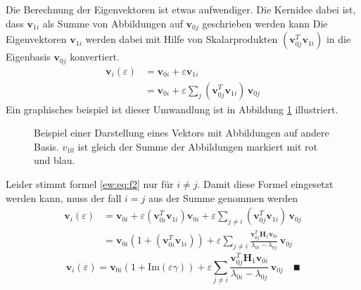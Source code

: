 Die Berechnung der Eigenvektoren ist etwas aufwendiger.
Die Kernidee dabei ist, dass $\bm v_{1i}$ als Summe von Abbildungen auf $\bm v_{0j}$ geschrieben werden kann
Die Eigenvektoren $\bm v_{1i}$ werden dabei mit Hilfe von Skalarprodukten $( \bm v_{0j}^T \bm v_{1i})$ in die Eigenbasis $\bm v_{0j}$ konvertiert. %
\begin{align*}
    \bm v_i(\varepsilon)
    &=
    \bm v_{0i} + \varepsilon \bm v_{1i} \\
    &=
    \bm v_{0i} + \varepsilon \sum_{j} ( \bm v_{0j}^T \bm v_{1i}) \, \bm v_{0j}
\end{align*}
Ein graphisches beispiel ist dieser Umwandlung ist in Abbildung \ref{ew:fig:scalar_prod} illustriert.
\begin{figure}
    \begin{center}
        
    \end{center}
    \caption[Eigenräume]{
        Beispiel einer Darstellung eines Vektors mit Abbildungen auf andere Basis.
        $v_{10}$ ist gleich der Summe der Abbildungen markiert mit rot und blau.
    } \label{ew:fig:scalar_prod}
\end{figure}
Leider stimmt formel \ref{ew:eq:f2} nur für $i \neq j$. Damit diese Formel eingesetzt werden kann, muss der fall $i = j$ aus der Summe genommen werden
\begin{align}
    \bm v_i(\varepsilon)
    &=
    \bm v_{0i} + \varepsilon ( \bm v_{0i}^T \bm v_{1i}) \bm v_{0i} + \varepsilon \sum_{j \neq i} (\bm v_{0j}^T \bm v_{1i}) \, \bm v_{0j} \\
    &=
    \bm v_{0i} ( 1 + (\bm v_{0i}^T \bm v_{1i}) ) + \varepsilon \sum_{j \neq i}
    \frac{\bm v_{0j}^T \bm H_1 \bm v_{0i}}{\lambda_{0i} - \lambda_{0j}}
    \, \bm v_{0j}
\end{align}
\begin{equation}
    \bm v_i(\varepsilon)
    =
    \bm v_{0i} ( 1 + \mathrm{Im}(\varepsilon \gamma) ) + \varepsilon \sum_{j \neq i}
    \frac{\bm v_{0j}^T \bm H_1 \bm v_{0i}}{\lambda_{0i} - \lambda_{0j}}
    \, \bm v_{0j}
    \quad
    \QED
    \label{ew:eq:explicit_eigvecs}
\end{equation}



